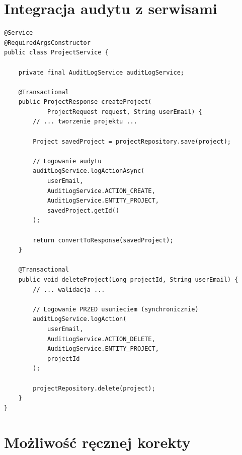 \documentclass[12pt,a4paper]{report}
\begin{document}
\section{Integracja audytu z serwisami}

\begin{lstlisting}[style=javastyle, caption={Użycie audytu w ProjectService}]
@Service
@RequiredArgsConstructor
public class ProjectService {

    private final AuditLogService auditLogService;

    @Transactional
    public ProjectResponse createProject(
            ProjectRequest request, String userEmail) {
        // ... tworzenie projektu ...
        
        Project savedProject = projectRepository.save(project);
        
        // Logowanie audytu
        auditLogService.logActionAsync(
            userEmail, 
            AuditLogService.ACTION_CREATE, 
            AuditLogService.ENTITY_PROJECT, 
            savedProject.getId()
        );
        
        return convertToResponse(savedProject);
    }

    @Transactional
    public void deleteProject(Long projectId, String userEmail) {
        // ... walidacja ...
        
        // Logowanie PRZED usunieciem (synchronicznie)
        auditLogService.logAction(
            userEmail, 
            AuditLogService.ACTION_DELETE, 
            AuditLogService.ENTITY_PROJECT, 
            projectId
        );
        
        projectRepository.delete(project);
    }
}
\end{lstlisting}

\section{Możliwość ręcznej korekty}
\end{document}

